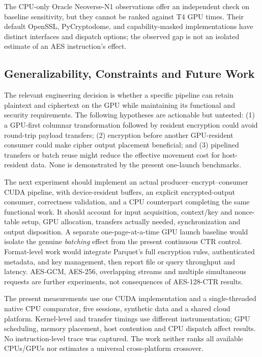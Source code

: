 The CPU-only Oracle Neoverse-N1 observations offer an independent check
on baseline sensitivity, but they cannot be ranked against T4 GPU times.
Their default OpenSSL, PyCryptodome, and capability-masked implementations
have distinct interfaces and dispatch options; the observed gap is not an
isolated estimate of an AES instruction's effect.

\subsection{Generalizability, Constraints and Future Work}
The relevant engineering decision is whether a specific pipeline can retain
plaintext and ciphertext on the GPU while maintaining its functional and
security requirements. The following hypotheses are actionable but untested:
(1) a GPU-first columnar transformation followed by resident encryption could
avoid round-trip payload transfers; (2) encryption before another GPU-resident
consumer could make cipher output placement beneficial; and (3) pipelined
transfers or batch reuse might reduce the effective movement cost for
host-resident data. None is demonstrated by the present one-launch benchmarks.

The next experiment should implement an actual producer--encrypt--consumer
CUDA pipeline, with device-resident buffers, an explicit encrypted-output
consumer, correctness validation, and a CPU counterpart completing the same
functional work. It should account for input acquisition, context/key and
nonce-table setup, GPU allocation, transfers actually needed, synchronization
and output disposition. A separate one-page-at-a-time GPU launch baseline
would isolate the genuine \emph{batching} effect from the present continuous
CTR control. Format-level work would integrate Parquet's full encryption
rules, authenticated metadata, and key management, then report file or query
throughput and latency. AES-GCM, AES-256, overlapping streams and multiple
simultaneous requests are further experiments, not consequences of AES-128-CTR
results.

The present measurements use one CUDA implementation and a single-threaded
native CPU comparator, five sessions, synthetic data and a shared cloud
platform. Kernel-level and transfer timings use different instrumentation;
GPU scheduling, memory placement, host contention and CPU dispatch affect
results. No instruction-level trace was captured. The work neither ranks all
available CPUs/GPUs nor estimates a universal cross-platform crossover.
